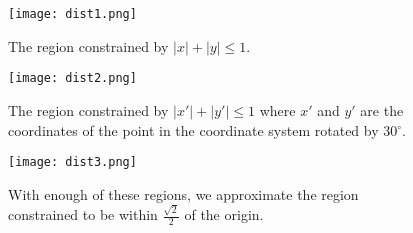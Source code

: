 \begin{figure} 
\texttt{[image: dist1.png]}
\caption{The region constrained by $|x| + |y| \leq 1$.}
\label{dist1}
\end{figure}

\begin{figure} 
\texttt{[image: dist2.png]}
\caption{The region constrained by $|x'| + |y'| \leq 1$ where $x'$ and $y'$ are the coordinates of the point in the coordinate system rotated by 30$^\circ$.}
\label{dist2}
\end{figure}

\begin{figure} 
\texttt{[image: dist3.png]}
\caption{With enough of these regions, we approximate the region constrained to be within $\frac{\sqrt{2}}{2}$ of the origin.}
\label{dist3}
\end{figure}






\begin{comment}
This section should include the following:
\begin{itemize}
		
\item	A description of the methods you are using (which itself could have
	sub-sections). If you have created a new application, you should describe
	which tools you have used to do so and the steps of your implementation. You
	should also briefly describe each of the tools you used (e.g. Ruby on Rails,
	MongoDB, D3, etc.). If you have proposed a new algorithm to solve a problem,
	you should provide the details of your algorithm along with pseudocode. If
	your algorithm is quite complex, you should describe its running time.  

\item Description of any data you used and explanation of why you chose this
	particular data (possibly organized into sub-sections).

\item Link to a GitHub, BitBucket or other repository if relevant.

\end{itemize}
\end{comment}